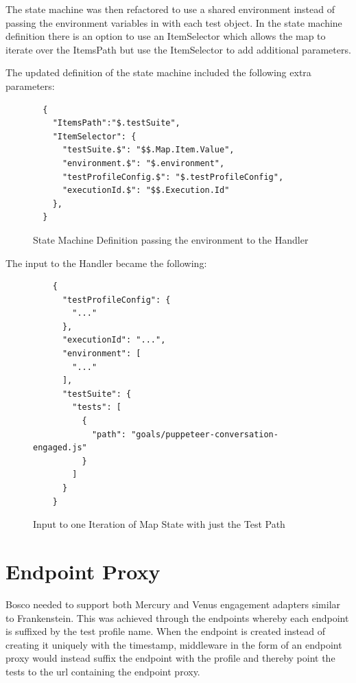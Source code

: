 \documentclass[12pt,a4paper,titlepage]{report}
\begin{document}
The state machine was then refactored to use a shared environment instead of
passing the environment variables in with each test object. In the state machine definition there is an option to
use an ItemSelector which allows the map to iterate over the ItemsPath but use the ItemSelector to add additional
parameters.

The updated definition of the state machine included the following extra parameters:

\begin{figure}[H]
 \begin{tcolorbox}
  \begin{verbatim}
  {
    "ItemsPath":"$.testSuite",
    "ItemSelector": {
      "testSuite.$": "$$.Map.Item.Value",
      "environment.$": "$.environment",
      "testProfileConfig.$": "$.testProfileConfig",
      "executionId.$": "$$.Execution.Id"
    },
  }
\end{verbatim}
 \end{tcolorbox}
 \caption{State Machine Definition passing the environment to the Handler}
\end{figure}

The input to the Handler became the following:

\begin{figure}[ht]
 \begin{tcolorbox}
  \begin{verbatim}
    {
      "testProfileConfig": {
        "..."
      },
      "executionId": "...",
      "environment": [
        "..."
      ],
      "testSuite": {
        "tests": [
          {
            "path": "goals/puppeteer-conversation-engaged.js"
          }
        ]
      }
    }
\end{verbatim}
 \end{tcolorbox}
 \caption{Input to one Iteration of Map State with just the Test Path}
\end{figure}

\section{Endpoint Proxy}

Bosco needed to support both Mercury and Venus engagement adapters similar to Frankenstein. This was achieved through the endpoints whereby 
each endpoint is suffixed by the test profile name. When the endpoint is created instead of creating it uniquely with the timestamp, middleware 
in the form of an endpoint proxy would instead suffix the endpoint with the profile and thereby point the tests to the url 
containing the endpoint proxy. 
\end{document}

